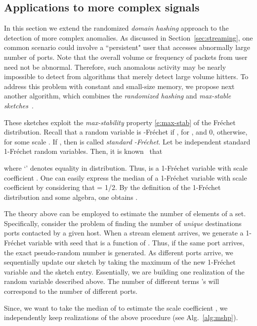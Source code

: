 \documentclass[10pt, conference, letterpaper,onecolumn]{IEEEtranv1.8}
\theoremstyle{plain}\newtheorem{thm}{Theorem}\newtheorem{lem}{Lemma}
\theoremstyle{definition}
\begin{document}
 
 
\subsection{Applications to more complex signals}
\label{sec:ms}

 In this section we extend the randomized  {\em domain hashing} approach to the detection of more 
 complex anomalies. As discussed in Section~\ref{sec:streaming}, one common scenario could involve 
a ``persistent" user  that accesses abnormally large
 number of ports.  Note that the overall volume or frequency of packets from user  need not be abnormal. Therefore, such anomalous activity may be
 nearly impossible to detect from  algorithms that merely detect large volume hitters. 
 To address this problem with constant and small-size memory, 
 we propose next another algorithm, which combines the {\em randomized hashing} and
 {\em max-stable sketches}~\cite{4221749}.
 


 These sketches exploit the {\em max-stability} property \eqref{e:max-stab} of the Fr\'echet distribution.
 Recall that a random variable  is -Fr\'{e}chet if , for , and
 0, otherwise, for some scale . If , then  is called  {\em standard -Fr\'echet}.
 Let  be independent standard 1-Fr\'{e}chet random variables. Then, it is known~\cite{4221749} that 
 
 where `' denotes equality in distribution.
Thus,  is a 1-Fr\'{e}chet variable with scale coefficient . One can easily express
the median of a 1-Fr\'{e}chet variable  with scale coefficient  by considering that
 = 1/2. By the definition of the 1-Fr\'{e}chet distribution and some algebra,
one obtains .

The theory above can be employed to estimate the number of elements of a set.
Specifically, consider the problem of finding the number of {\em unique} destinations ports
contacted by a given host. When a stream element  arrives, we generate a 1-Fr\'{e}chet
variable with seed that is a function of . Thus,  if the same port arrives, the exact 
pseudo-random number  is generated. As different ports arrive, we sequentially update 
our sketch by taking the maximum of the new 1-Fr\'{e}chet variable
and the sketch entry. Essentially, we are building one realization of the  random variable 
described above.  The number of different terms 's will correspond to the number of different ports.

Since, we want to take the median of  to estimate the scale coefficient ,
we independently keep  realizations of the above procedure (see Alg.\ \ref{alg:mshp}).
 
\end{document}
